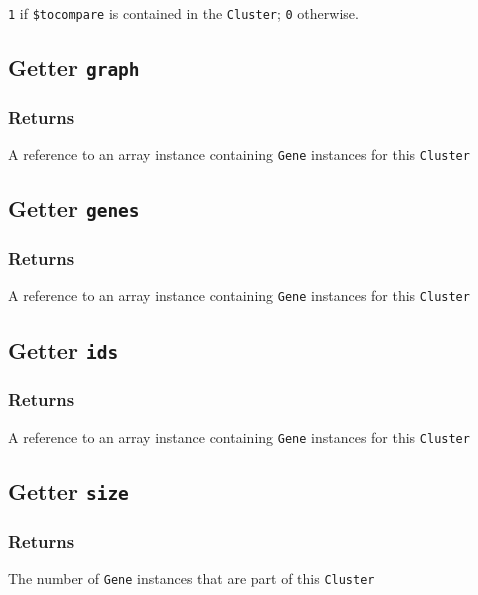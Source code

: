 \texttt{1} if \texttt{\$tocompare} is contained in the \texttt{Cluster}; \texttt{0} otherwise.

\subsection*{Getter \texttt{graph}\label{Getter_graph}}
\subsubsection*{Returns\label{Returns}}


A reference to an array instance containing \texttt{Gene} instances for this \texttt{Cluster}

\subsection*{Getter \texttt{genes}\label{Getter_genes}}
\subsubsection*{Returns\label{Returns}}


A reference to an array instance containing \texttt{Gene} instances for this \texttt{Cluster}

\subsection*{Getter \texttt{ids}\label{Getter_ids}}
\subsubsection*{Returns\label{Returns}}


A reference to an array instance containing \texttt{Gene} instances for this \texttt{Cluster}

\subsection*{Getter \texttt{size}\label{Getter_size}}
\subsubsection*{Returns\label{Returns}}


The number of \texttt{Gene} instances that are part of this \texttt{Cluster}

